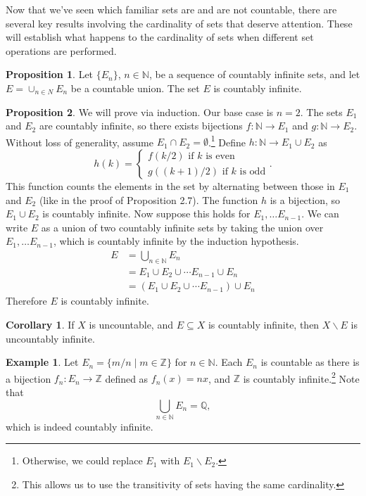 \documentclass{article}
\newcommand{\N}{\mathbb{N}}
\newcommand{\Q}{\mathbb{Q}}
\newcommand{\Z}{\mathbb{Z}}
\theoremstyle{definition}
\newtheorem{proposition}{Proposition}[section]
\newtheorem{corollary}{Corollary}[section]
\newtheorem{example}{Example}[section]
\begin{document}
	Now that we've seen which familiar sets are and are not countable, there are several key results involving the cardinality of sets that deserve attention. These will establish what happens to the cardinality of sets when different set operations are performed. 
	\begin{proposition}
		Let $ \{E_n\} $, $ n\in\N $, be a sequence of countably infinite sets, and let $ E=\cup_{n\in N}E_n $ be a countable union. The set $ E $ is countably infinite. 
	\end{proposition}
	\begin{proposition}
		We will prove via induction. Our base case is $ n=2 $. The sets $ E_1 $ and $ E_2 $ are countably infinite, so there exists bijections $ f:\N\to E_1 $ and $ g:\N\to E_2 $. Without loss of generality, assume $ E_1\cap E_2=\emptyset $.\footnote{Otherwise, we could replace $ E_1 $ with $ E_1\backslash E_2 $.} Define $ h:\N\to E_1\cup E_2 $ as $$ h(k)=\begin{cases}
			f(k/2)\text{ if }k  \text{ is even}\\
			g((k+1)/2)\text{ if }k  \text{ is odd}
		\end{cases}. $$ This function counts the elements in the set by alternating between those in $ E_1 $ and $ E_2 $ (like in the proof of Proposition 2.7). The function $ h $ is a bijection, so $ E_1\cup E_2 $ is countably infinite. Now suppose this holds for $ E_1,\ldots E_{n-1} $. We can write $ E $ as a union of two countably infinite sets by taking the union over $ E_1,\ldots E_{n-1} $, which is countably infinite by the induction hypothesis. 
		\begin{align*}
			E&=\bigcup_{n\in \N} E_n\\
			&=E_1\cup E_2\cup\cdots E_{n-1}\cup E_n\\
			&=(E_1\cup E_2\cup\cdots E_{n-1})\cup E_n
		\end{align*} 
		Therefore $ E $ is countably infinite. 
	\end{proposition}
	\begin{corollary}
		If $ X $ is uncountable, and $ E\subseteq X $ is countably infinite, then $ X\backslash E$ is uncountably infinite.
	\end{corollary}
	\begin{example}
		Let $ E_n=\{m/n\mid m\in\Z\} $ for $ n\in\N $. Each $ E_n $ is countable as there is a bijection $ f_n:E_n\to\Z $ defined as $ f_n(x)=nx $, and $ \Z $ is countably infinite.\footnote{This allows us to use the transitivity of sets having the same cardinality.} Note that $$\bigcup_{n\in \N}E_n=\Q, $$ which is indeed countably infinite. 
	\end{example}
\end{document}

